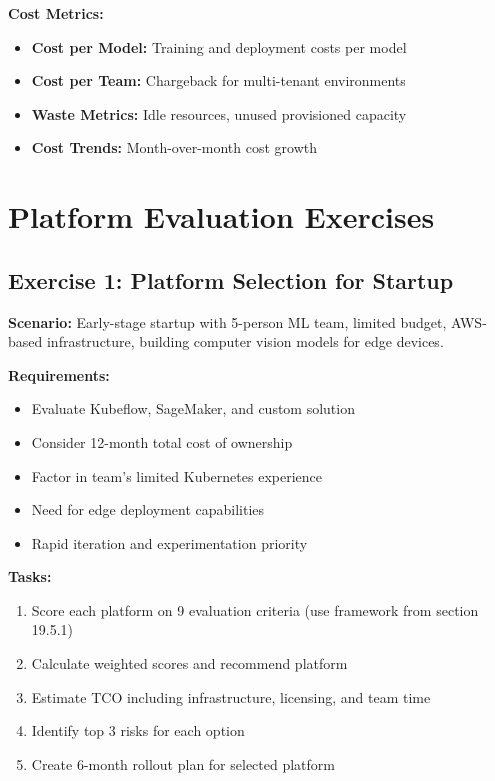 \textbf{Cost Metrics:}
\begin{itemize}
    \item \textbf{Cost per Model:} Training and deployment costs per model
    \item \textbf{Cost per Team:} Chargeback for multi-tenant environments
    \item \textbf{Waste Metrics:} Idle resources, unused provisioned capacity
    \item \textbf{Cost Trends:} Month-over-month cost growth
\end{itemize}

\section{Platform Evaluation Exercises}

\subsection{Exercise 1: Platform Selection for Startup}

\textbf{Scenario:} Early-stage startup with 5-person ML team, limited budget, AWS-based infrastructure, building computer vision models for edge devices.

\textbf{Requirements:}
\begin{itemize}
    \item Evaluate Kubeflow, SageMaker, and custom solution
    \item Consider 12-month total cost of ownership
    \item Factor in team's limited Kubernetes experience
    \item Need for edge deployment capabilities
    \item Rapid iteration and experimentation priority
\end{itemize}

\textbf{Tasks:}
\begin{enumerate}
    \item Score each platform on 9 evaluation criteria (use framework from section 19.5.1)
    \item Calculate weighted scores and recommend platform
    \item Estimate TCO including infrastructure, licensing, and team time
    \item Identify top 3 risks for each option
    \item Create 6-month rollout plan for selected platform
\end{enumerate}

